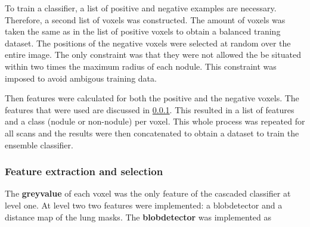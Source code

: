 To train a classifier, a list of positive and negative
examples are necessary. Therefore, a second list of voxels was constructed. The
amount of voxels was taken the same as in the list of positive voxels to obtain
a balanced traning dataset. The positions of the negative voxels were selected
at random over the entire image. The only constraint was that they were not
allowed the be situated within two times the maximum radius of each nodule. This
constraint was imposed to avoid ambigous training data.

Then features were calculated for both the positive and the negative voxels. The
features that were used are discussed in \ref{sec:featureExtraction}. This
resulted in a list of features and a class (nodule or non-nodule) per voxel.
This whole process was repeated for all scans and the results were then
concatenated to obtain a dataset to train the ensemble classifier.

\subsubsection{Feature extraction and selection} \label{sec:featureExtraction}
The \textbf{greyvalue} of each voxel was the only feature of the
cascaded classifier at level one. 
At level two two features were implemented: a blobdetector and a distance map
of the lung masks. The \textbf{blobdetector} was implemented as 



